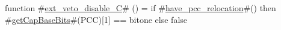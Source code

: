 function #\hyperref[sailRISCVzextzyvetozydisablezyC]{ext\_veto\_disable\_C}# () = {
  if #\hyperref[sailRISCVzhavezypcczyrelocation]{have\_pcc\_relocation}#()
  then #\hyperref[sailRISCVzgetCapBaseBits]{getCapBaseBits}#(PCC)[1] == bitone
  else false
}
